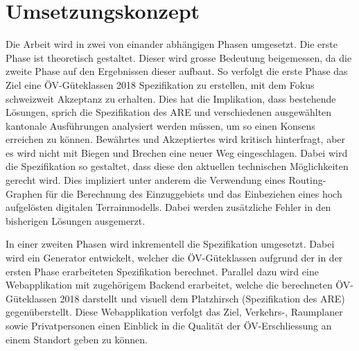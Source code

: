 
\section{Umsetzungskonzept}
\label{Umsetzungskonzept}

Die Arbeit wird in zwei von einander abhängigen Phasen umgesetzt.
Die erste Phase ist theoretisch gestaltet.
Dieser wird grosse Bedeutung beigemessen, da die zweite Phase auf den Ergebnissen dieser aufbaut.
So verfolgt die erste Phase das Ziel eine \acs{ÖV}-Güteklassen 2018 Spezifikation zu erstellen, mit dem Fokus schweizweit Akzeptanz zu erhalten.
Dies hat die Implikation, dass bestehende Lösungen, sprich die Spezifikation des \acl{ARE} und verschiedenen ausgewählten kantonale Ausführungen analysiert werden müssen, um so einen Konsens erreichen zu können.
Bewährtes und Akzeptiertes wird kritisch hinterfragt, aber es wird nicht mit Biegen und Brechen eine neuer Weg eingeschlagen.
Dabei wird die Spezifikation so gestaltet, dass diese den aktuellen technischen Möglichkeiten gerecht wird.
Dies impliziert unter anderem die Verwendung eines Routing-Graphen für die Berechnung des Einzuggebiets und das Einbeziehen eines hoch aufgelösten digitalen Terrainmodells.
Dabei werden zusätzliche Fehler in den bisherigen Lösungen ausgemerzt.

In einer zweiten Phasen wird inkrementell die Spezifikation umgesetzt.
Dabei wird ein Generator entwickelt, welcher die \acs{ÖV}-Güteklassen aufgrund der in der ersten Phase erarbeiteten Spezifikation berechnet.
Parallel dazu wird eine Webapplikation mit zugehörigem Backend erarbeitet, welche die berechneten \acs{ÖV}-Güteklassen 2018 darstellt und visuell dem Platzhirsch (Spezifikation des \acl{ARE}) gegenüberstellt.
Diese Webapplikation verfolgt das Ziel, Verkehrs-, Raumplaner sowie Privatpersonen einen Einblick in die Qualität der ÖV-Erschliessung an einem Standort geben zu können.
